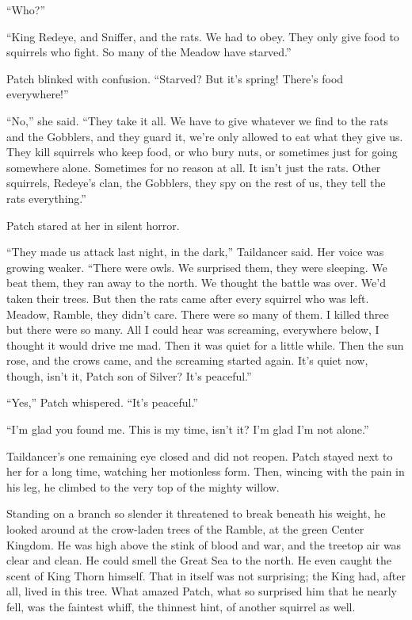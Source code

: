\documentclass[ebook,oneside,openany,17pt]{memoir}
\newenvironment{tolerant}[1]{%
  \par\tolerance=#1\relax
}{%
  \par
}
\begin{document}
“Who?”

“King Redeye, and Sniffer, and the rats. We had to obey. They only
give food to squirrels who fight. So many of the Meadow have starved.”

Patch blinked with confusion. “Starved? But it’s spring! There’s food
everywhere!”

“No,” she said. “They take it all. We have to give whatever we find to
the rats and the Gobblers, and they guard it, we’re only allowed to
eat what they give us. They kill squirrels who keep food, or who bury
nuts, or sometimes just for going somewhere alone. Sometimes for no
reason at all. It isn’t just the rats. Other squirrels, Redeye’s clan,
the Gobblers, they spy on the rest of us, they tell the rats
everything.”

Patch stared at her in silent horror.

\begin{tolerant}{5000}
“They made us attack last night, in the dark,” Taildancer said. Her
voice was growing weaker. “There were owls. We surprised them, they
were sleeping. We beat them, they ran away to the north. We thought
the battle was over. We’d taken their trees. But then the rats came
after every squirrel who was left. Meadow, Ramble, they didn’t
care. There were so many of them. I killed three but there were so
many. All I could hear was screaming, everywhere below, I thought it
would drive me mad. Then it was quiet for a little while. Then the sun
rose, and the crows came, and the screaming started again. It’s quiet
now, though, isn’t it, Patch son of Silver? It’s peaceful.”
\end{tolerant}

“Yes,” Patch whispered. “It’s peaceful.”

“I’m glad you found me. This is my time, isn’t it? I’m glad I’m not
alone.”

Taildancer’s one remaining eye closed and did not reopen. Patch stayed
next to her for a long time, watching her motionless form. Then,
wincing with the pain in his leg, he climbed to the very top of the
mighty willow.

Standing on a branch so slender it threatened to break beneath his
weight, he looked around at the crow-laden trees of the Ramble, at the
green Center Kingdom. He was high above the stink of blood and war,
and the treetop air was clear and clean. He could smell the Great Sea
to the north. He even caught the scent of King Thorn himself. That in
itself was not surprising; the King had, after all, lived in this
tree. What amazed Patch, what so surprised him that he nearly fell,
was the faintest whiff, the thinnest hint, of another squirrel as
well.
\end{document}
